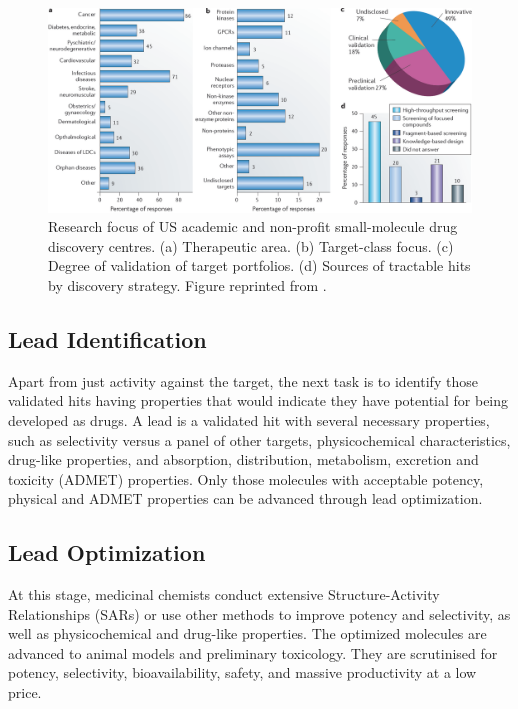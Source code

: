 \begin{figure}
\centering
\includegraphics[width=\textwidth]{Figures/USAcademicDrugDiscoveryResearchFocus.png}
\caption{Research focus of US academic and non-profit small-molecule drug discovery centres. (a) Therapeutic area. (b) Target-class focus. (c) Degree of validation of target portfolios. (d) Sources of tractable hits by discovery strategy. Figure reprinted from \citep{721}.}
\label{fig:USAcademicDrugDiscoveryResearchFocus}
\end{figure}

\subsection{Lead Identification}

Apart from just activity against the target, the next task is to identify those validated hits having properties that would indicate they have potential for being developed as drugs. A lead is a validated hit with several necessary properties, such as selectivity versus a panel of other targets, physicochemical characteristics, drug-like properties, and absorption, distribution, metabolism, excretion and toxicity (ADMET) properties. Only those molecules with acceptable potency, physical and ADMET properties can be advanced through lead optimization.

\subsection{Lead Optimization}

At this stage, medicinal chemists conduct extensive Structure-Activity Relationships (SARs) \citep{328} or use other methods \citep{661,475} to improve potency and selectivity, as well as physicochemical and drug-like properties. The optimized molecules are advanced to animal models and preliminary toxicology. They are scrutinised for potency, selectivity, bioavailability, safety, and massive productivity at a low price.

